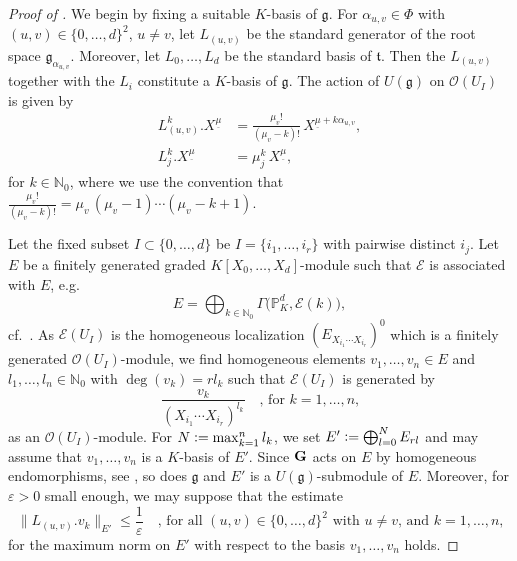 \documentclass[a4paper, reqno, 10pt]{amsart}
\theoremstyle{definition}
\numberwithin{equation}{section}
\newcommand{\defeq}{\vcentcolon=}
\newcommand{\ul}[1]{{\underline{#1}}}
\newcommand{\BN}{{\mathbb {N}}}
\newcommand{\BP}{{\mathbb {P}}}
\newcommand{\CE}{{\mathcal {E}}}
\newcommand{\CO}{{\mathcal {O}}}
\newcommand{\bG}{{\mathrm{\bf G}}}
\newcommand{\Fg}{{\mathfrak {g}}}
\newcommand{\Ft}{{\mathfrak {t}}}
\begin{document}
\begin{proof}[{Proof of }]


We begin by fixing a suitable $K$-basis of $\Fg$.
For $\alpha_{u,v}\in \Phi$ with $(u,v) \in \{0,\ldots,d\}^2$, $u\neq v$, let $L_{(u,v)}$ be the standard generator of the root space $\Fg_{\alpha_{u,v}}$.
Moreover, let $L_0,\ldots,L_d$ be the standard basis of $\Ft$.
Then the $L_{(u,v)}$ together with the $L_i$ constitute a $K$-basis of $\Fg$.
The action of $U(\Fg)$ on $\CO(U_I)$ is given by \cite[(1.5)]{Orlik08EquivVBDrinfeldUpHalfSp}
\begin{align*}
	L_{(u,v)}^k . X^\ul{\mu} &= \frac{\mu_v!}{(\mu_v - k)!} \, X^{\ul{\mu} +k \alpha_{u,v}} ,\\
	L^k_j . X^\ul{\mu} &= \mu_j^k \, X^\ul{\mu} ,
\end{align*}
for $k\in \BN_0$, where we use the convention that $\frac{\mu_v!}{(\mu_v-k)!} = \mu_v\, (\mu_v -1) \cdots (\mu_v - k+1)$.


Let the fixed subset $I \subset \{0,\ldots,d\}$ be $I = \{i_1,\ldots,i_r\}$ with pairwise distinct $i_j$.
Let $E$ be a finitely generated graded $K[X_0,\ldots, X_d]$-module such that $\CE$ is associated with $E$, e.g.\
\begin{equation*}
	E = \bigoplus_{k \in \BN_0} \Gamma \big( \BP_K^d , \CE(k) \big) ,
\end{equation*}
cf.\ \cite[\href{https://stacks.math.columbia.edu/tag/0BXD}{Tag 0BXD}]{StacksProject}.
As $\CE(U_I)$ is the homogeneous localization $(E_{X_{i_1}\cdots X_{i_r}})^0$ which is a finitely generated $\CO(U_I)$-module, we find homogeneous elements $v_1,\ldots,v_n\in E$ and $l_1,\ldots,l_n \in \BN_0$ with $\deg(v_k) = r l_k$ such that $\CE(U_I)$ is generated by 
\begin{equation*}
	\frac{v_k}{(X_{i_1}\cdots X_{i_r})^{l_k}} \quad\text{, for $k=1,\ldots,n$,}
\end{equation*}
as an $\CO(U_I)$-module.
For $N\defeq \max_{k=1}^n l_k$, we set $E' \defeq \bigoplus_{l=0}^N E_{rl}$ and may assume that $v_1,\ldots,v_n$ is a $K$-basis of $E'$.
Since $\bG$ acts on $E$ by homogeneous endomorphisms, see \cite[\S 2.3.1]{Kuschkowitz16EquivVBRigidCohomDrinfeldUpHalfSpFF}, so does $\Fg$ and $E'$ is a $U(\Fg)$-submodule of $E$.
Moreover, for $\varepsilon>0$ small enough, we may suppose that the estimate
\begin{equation}\label{Eq 3 - Smallness condition on epsilon}
	\big\lVert L_{(u,v)}. v_k \big\rVert_{E'} \leq \frac{1}{\varepsilon} \quad\text{, for all $(u,v)\in \{0,\ldots,d\}^2$ with $u\neq v$, and $k=1,\ldots,n$,}
\end{equation}
for the maximum norm on $E'$ with respect to the basis $v_1,\ldots,v_n$ holds.


\end{proof}
\end{document}
